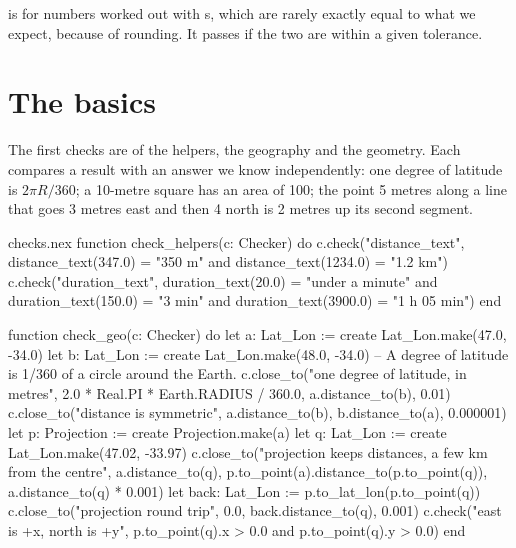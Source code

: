  is for numbers worked out with s, which are
rarely exactly equal to what we expect, because of rounding. It passes if
the two are within a given tolerance.

\section{The basics}

The first checks are of the helpers, the geography and the geometry. Each
compares a result with an answer we know independently: one degree of
latitude is $2\pi R / 360$; a 10-metre square has an area of 100; the
point 5 metres along a line that goes 3 metres east and then 4 north is
2 metres up its second segment.

\begin{append}{checks.nex}
function check_helpers(c: Checker) do
  c.check("distance_text", distance_text(347.0) = "350 m" and distance_text(1234.0) = "1.2 km")
  c.check("duration_text", duration_text(20.0) = "under a minute"
    and duration_text(150.0) = "3 min" and duration_text(3900.0) = "1 h 05 min")
end

function check_geo(c: Checker) do
  let a: Lat_Lon := create Lat_Lon.make(47.0, -34.0)
  let b: Lat_Lon := create Lat_Lon.make(48.0, -34.0)
  -- A degree of latitude is 1/360 of a circle around the Earth.
  c.close_to("one degree of latitude, in metres", 2.0 * Real.PI * Earth.RADIUS / 360.0,
    a.distance_to(b), 0.01)
  c.close_to("distance is symmetric", a.distance_to(b), b.distance_to(a), 0.000001)
  let p: Projection := create Projection.make(a)
  let q: Lat_Lon := create Lat_Lon.make(47.02, -33.97)
  c.close_to("projection keeps distances, a few km from the centre", a.distance_to(q),
    p.to_point(a).distance_to(p.to_point(q)), a.distance_to(q) * 0.001)
  let back: Lat_Lon := p.to_lat_lon(p.to_point(q))
  c.close_to("projection round trip", 0.0, back.distance_to(q), 0.001)
  c.check("east is +x, north is +y", p.to_point(q).x > 0.0 and p.to_point(q).y > 0.0)
end


\end{append}
